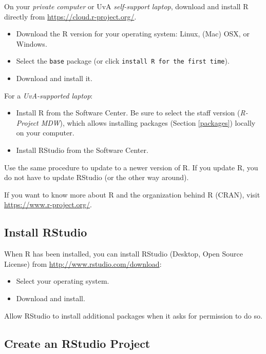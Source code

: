 \documentclass[doc,floatsintext]{apa6}
\providecommand{\tightlist}{%
  \setlength{\itemsep}{0pt}\setlength{\parskip}{0pt}}
\begin{document}
On your \emph{private computer} or UvA \emph{self-support laptop},
download and install R directly from \url{https://cloud.r-project.org/}.

\begin{itemize}
\tightlist
\item
  Download the R version for your operating system: Linux, (Mac) OSX, or
  Windows.
\item
  Select the \texttt{base} package (or click
  \texttt{install\ R\ for\ the\ first\ time}).
\item
  Download and install it.
\end{itemize}

For a \emph{UvA-supported laptop}:

\begin{itemize}
\tightlist
\item
  Install R from the Software Center. Be sure to select the staff
  version (\emph{R-Project MDW}), which allows installing packages
  (Section \ref{packages}) locally on your computer.
\item
  Install RStudio from the Software Center.
\end{itemize}

Use the same procedure to update to a newer version of R. If you update
R, you do not have to update RStudio (or the other way around).

If you want to know more about R and the organization behind R (CRAN),
visit \url{https://www.r-project.org/}.

\subsection{Install RStudio}\label{install-rstudio}

When R has been installed, you can install RStudio (Desktop, Open Source
License) from \url{http://www.rstudio.com/download}:

\begin{itemize}
\tightlist
\item
  Select your operating system.
\item
  Download and install.
\end{itemize}

Allow RStudio to install additional packages when it asks for permission
to do so.

\subsection{Create an RStudio Project}\label{create-an-rstudio-project}
\end{document}
